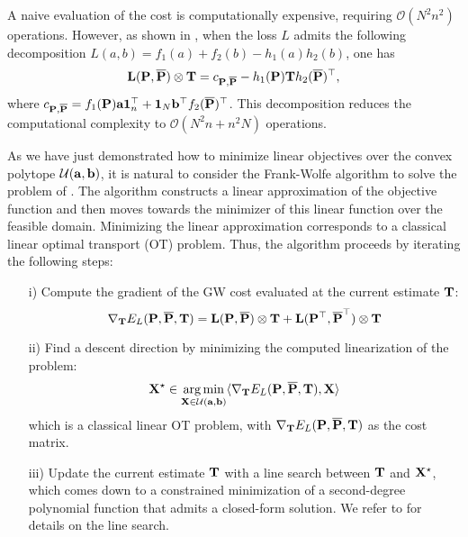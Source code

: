 A naive evaluation of the cost is computationally expensive, requiring $\mathcal{O}(N^2n^2)$ operations. However, as shown in \citep{peyre2016gromov}, when the loss $L$ admits the following decomposition $L(a, b) = f_{1}(a) + f_{2}(b) - h_{1}(a) h_{2}(b)$, one has
\[
{\mathbf{L}}({\mathbf{P}}, \overline{{\mathbf{P}}}) \otimes {\mathbf{T}} = c_{{\mathbf{P}}, \overline{{\mathbf{P}}}} - h_1({\mathbf{P}}) {\mathbf{T}} h_2(\overline{{\mathbf{P}}})^\top,
\]
where $c_{{\mathbf{P}}, \overline{{\mathbf{P}}}} = f_1({\mathbf{P}}) {\mathbf{a}} \mathbf{1}_n^\top + \mathbf{1}_N {\mathbf{b}}^\top f_2(\overline{{\mathbf{P}}})^\top$. This decomposition reduces the computational complexity to $\mathcal{O}(N^2n + n^2N)$ operations.

As we have just demonstrated how to minimize linear objectives over the convex polytope ${\mathcal{U}}({\mathbf{a}}, {\mathbf{b}})$, it is natural to consider the Frank-Wolfe algorithm \citep{frank1956algorithm} to solve the problem of . The algorithm constructs a linear approximation of the objective function and then moves towards the minimizer of this linear function over the feasible domain. Minimizing the linear approximation corresponds to a classical linear optimal transport (OT) problem. Thus, the algorithm proceeds by iterating the following steps:
\begin{enumerate}
    \item[i)] Compute the gradient of the GW cost evaluated at the current estimate ${\mathbf{T}}$:
    \[
        \nabla_{{\mathbf{T}}} E_L({\mathbf{P}}, \overline{{\mathbf{P}}}, {\mathbf{T}}) = {\mathbf{L}}({\mathbf{P}}, \overline{{\mathbf{P}}}) \otimes {\mathbf{T}} + {\mathbf{L}}({\mathbf{P}}^\top, \overline{{\mathbf{P}}}^\top) \otimes {\mathbf{T}}
    \]
    
    \item[ii)] Find a descent direction by minimizing the computed linearization of the problem:
    \[
    {\mathbf{X}}^\star \in \operatorname*{arg\,min}_{{\mathbf{X}} \in \mathcal{U}({\mathbf{a}}, {\mathbf{b}})} \langle \nabla_{{\mathbf{T}}} E_L({\mathbf{P}}, \overline{{\mathbf{P}}}, {\mathbf{T}}), {\mathbf{X}} \rangle
    \]
    which is a classical linear OT problem, with $\nabla_{{\mathbf{T}}} E_L({\mathbf{P}}, \overline{{\mathbf{P}}}, {\mathbf{T}})$ as the cost matrix.
    
    \item[iii)] Update the current estimate ${\mathbf{T}}$ with a line search between ${\mathbf{T}}$ and ${\mathbf{X}}^\star$, which comes down to a constrained minimization of a second-degree polynomial function that admits a closed-form solution. We refer to \citep{vayer2020contribution} for details on the line search.
\end{enumerate}

